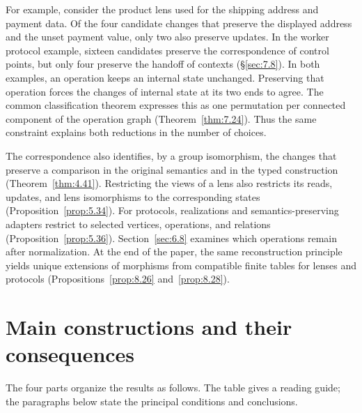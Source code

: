 For example, consider the product lens used for the shipping address and
payment data. Of the four candidate changes that preserve the displayed
address and the unset payment value, only two also preserve updates. In the
worker protocol example, sixteen candidates preserve the correspondence of
control points, but only four preserve the handoff of contexts
(\S\ref{sec:7.8}). In both examples, an operation keeps an internal state
unchanged. Preserving that operation forces the changes of internal state at
its two ends to agree. The common classification theorem expresses this as
one permutation per connected component of the operation graph
(Theorem~\ref{thm:7.24}). Thus the same constraint explains both reductions in
the number of choices.

The correspondence also identifies, by a group isomorphism, the changes that
preserve a comparison in the original semantics and in the typed construction
(Theorem~\ref{thm:4.41}). Restricting the views of a lens also restricts its reads, updates, and lens
isomorphisms to the corresponding states (Proposition~\ref{prop:5.34}).
For protocols, realizations and semantics-preserving adapters restrict to
selected vertices, operations, and relations (Proposition~\ref{prop:5.36}). Section~\ref{sec:6.8}
examines which operations remain after normalization. At the end of the paper,
the same reconstruction principle yields unique extensions of morphisms from
compatible finite tables for lenses and protocols (Propositions~\ref{prop:8.26}
and~\ref{prop:8.28}).

\section*{Main constructions and their consequences}

The four parts organize the results as follows. The table gives a reading
guide; the paragraphs below state the principal conditions and conclusions.

